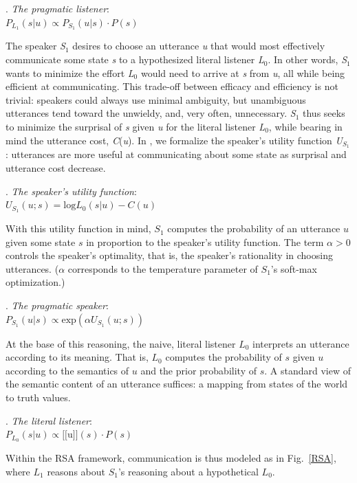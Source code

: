 \documentclass[linguex]{sp}
\newcommand{\sem}[1]{\mbox{$[\![$#1$]\!]$}}
\begin{document}
\ex. \emph{The pragmatic listener}:\\
$P_{L_{1}}(s|u) \propto P_{S_{1}}(u|s) \cdot P(s)$

The speaker \emph{S}$_{1}$ desires to choose an utterance \emph{u} that would most effectively communicate some state \emph{s} to a hypothesized literal listener \emph{L}$_{0}$.  In other words, \emph{S}$_{1}$ wants to minimize the effort \emph{L}$_{0}$ would need to arrive at \emph{s} from \emph{u}, all while being efficient at communicating. This trade-off between efficacy and efficiency is not trivial: speakers could always use minimal ambiguity, but unambiguous utterances tend toward the unwieldy, and, very often, unnecessary. \emph{S}$_{1}$ thus seeks to minimize the surprisal of \emph{s} given \emph{u} for the literal listener \emph{L}$_{0}$, while bearing in mind the utterance cost, \emph{C}(\emph{u}). In \Next, we formalize the speaker's utility function \emph{U}$_{S_{1}}$: utterances are more useful at communicating about some state as surprisal and utterance cost decrease.

\ex. \emph{The speaker's utility function}:\\
$U_{S_{1}}(u;s) = \textrm{log}L_{0}(s|u) - C(u)$

With this utility function in mind, $S_{1}$ computes the probability of an utterance $u$ given some state $s$ in proportion to the speaker's utility function. The term \mbox{$\alpha > 0$} controls the speaker's optimality, that is, the speaker's rationality in choosing utterances. ($\alpha$ corresponds to the temperature parameter of $S_{1}$'s soft-max optimization.)

\ex. \emph{The pragmatic speaker}:\\
$P_{S_{1}}(u|s) \propto \textrm{exp}(\alpha U_{S_{1}}\!(u;s))$

At the base of this reasoning, the naive, literal listener $L_{0}$ interprets an utterance according to its meaning. That is, $L_{0}$ computes the probability of $s$ given $u$ according to the semantics of $u$ and the prior probability of $s$. A standard view of the semantic content of an utterance suffices: a mapping from states of the world to truth values.

\ex. \emph{The literal listener}:\\
$P_{L_{0}}(s|u) \propto \sem{u}(s) \cdot P(s)$

Within the RSA framework, communication is thus modeled as in Fig.~\ref{RSA}, where $L_{1}$ reasons about $S_{1}$'s reasoning about a hypothetical $L_{0}$.
\end{document}
